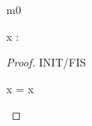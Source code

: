 \documentclass[12pt]{amsart}
\title{}
\author{}
\date{} %
\begin{document}
\maketitle


\begin{machine}{m0}

\begin{variable}
	x : \Int
\end{variable}

\begin{proof}{INIT/FIS}
	\begin{calculation}
		x = x
	\end{calculation}
\end{proof}

\end{machine}
\end{document}
